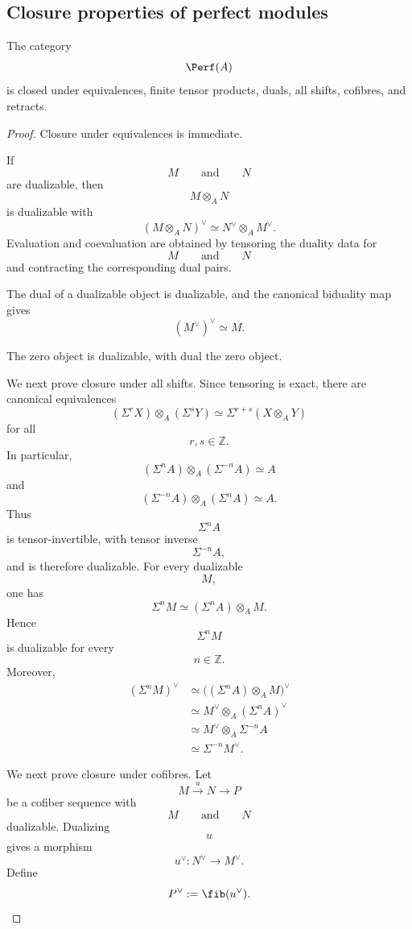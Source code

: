 \subsection{Closure properties of perfect modules}

\begin{lemma}
\label{lem:perfect-closed-tensor-dual}
The category
\[
    \Perf(A)
\]
is closed under equivalences, finite tensor products, duals, all shifts,
cofibres, and retracts.
\end{lemma}

\begin{proof}
Closure under equivalences is immediate.

If
\[
    M
    \qquad\text{and}\qquad
    N
\]
are dualizable, then
\[
    M\otimes_A N
\]
is dualizable with
\[
    (M\otimes_A N)^\vee
    \simeq
    N^\vee\otimes_A M^\vee.
\]
Evaluation and coevaluation are obtained by tensoring the duality data for
\[
    M
    \qquad\text{and}\qquad
    N
\]
and contracting the corresponding dual pairs.

The dual of a dualizable object is dualizable, and the canonical
biduality map gives
\[
    (M^\vee)^\vee
    \simeq
    M.
\]

The zero object is dualizable, with dual the zero object.

We next prove closure under all shifts. Since tensoring is exact, there are
canonical equivalences
\[
    (\Sigma^rX)\otimes_A(\Sigma^sY)
    \simeq
    \Sigma^{r+s}(X\otimes_A Y)
\]
for all
\[
    r,s\in\mathbb Z.
\]
In particular,
\[
    (\Sigma^nA)\otimes_A(\Sigma^{-n}A)
    \simeq
    A
\]
and
\[
    (\Sigma^{-n}A)\otimes_A(\Sigma^nA)
    \simeq
    A.
\]
Thus
\[
    \Sigma^nA
\]
is tensor-invertible, with tensor inverse
\[
    \Sigma^{-n}A,
\]
and is therefore dualizable. For every dualizable
\[
    M,
\]
one has
\[
    \Sigma^nM
    \simeq
    (\Sigma^nA)\otimes_A M.
\]
Hence
\[
    \Sigma^nM
\]
is dualizable for every
\[
    n\in\mathbb Z.
\]
Moreover,
\[
\begin{aligned}
    (\Sigma^nM)^\vee
    &\simeq
    \bigl(
        (\Sigma^nA)\otimes_A M
    \bigr)^\vee
    \\
    &\simeq
    M^\vee\otimes_A(\Sigma^nA)^\vee
    \\
    &\simeq
    M^\vee\otimes_A\Sigma^{-n}A
    \\
    &\simeq
    \Sigma^{-n}M^\vee.
\end{aligned}
\]

We next prove closure under cofibres. Let
\[
    M
    \xrightarrow{u}
    N
    \longrightarrow
    P
\]
be a cofiber sequence with
\[
    M
    \qquad\text{and}\qquad
    N
\]
dualizable. Dualizing
\[
    u
\]
gives a morphism
\[
    u^\vee
    \colon
    N^\vee
    \longrightarrow
    M^\vee.
\]
Define
\[
    P^\vee
    :=
    \fib(u^\vee).
\]


\end{proof}
